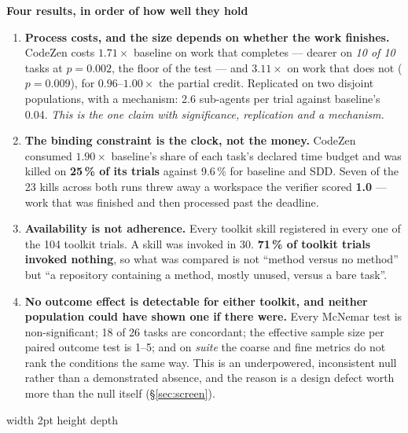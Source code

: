 \documentclass[11pt,a4paper]{article}
\newenvironment{finding}[1]
  {\par\medskip\noindent\begin{lrbox}{\findingbox}%
   \begin{minipage}{\dimexpr\linewidth-2\fboxsep-4pt}%
   \vspace{3pt}\textbf{\color{accent}#1}\par\smallskip\small}
  {\vspace{4pt}\end{minipage}\end{lrbox}%
   \noindent\textcolor{accent}{\vrule width 2pt height \dimexpr\ht\findingbox\relax depth \dimexpr\dp\findingbox\relax}%
   \colorbox{shade}{\usebox{\findingbox}}\par\medskip}
\begin{document}
\begin{finding}{Four results, in order of how well they hold}
\begin{enumerate}[nosep]
\item \textbf{Process costs, and the size depends on whether the work finishes.} CodeZen
      costs $\mathbf{1.71\times}$ baseline on work that completes --- dearer on \emph{10 of
      10} tasks at $p = 0.002$, the floor of the test --- and $\mathbf{3.11\times}$ on work
      that does not ($p = 0.009$), for $0.96$--$1.00\times$ the partial credit. Replicated on
      two disjoint populations, with a mechanism: 2.6 sub-agents per trial against baseline's
      0.04. \emph{This is the one claim with significance, replication and a mechanism.}
\item \textbf{The binding constraint is the clock, not the money.} CodeZen consumed
      $1.90\times$ baseline's share of each task's declared time budget and was killed on
      \textbf{25\,\% of its trials} against 9.6\,\% for baseline and SDD. Seven of the 23
      kills across both runs threw away a workspace the verifier scored \textbf{1.0} --- work
      that was finished and then processed past the deadline.
\item \textbf{Availability is not adherence.} Every toolkit skill registered in every one of
      the 104 toolkit trials. A skill was invoked in 30. \textbf{71\,\% of toolkit trials
      invoked nothing}, so what was compared is not ``method versus no method'' but ``a
      repository containing a method, mostly unused, versus a bare task''.
\item \textbf{No outcome effect is detectable for either toolkit, and neither population
      could have shown one if there were.} Every McNemar test is non-significant; 18 of 26
      tasks are concordant; the effective sample size per paired outcome test is 1--5; and on
      \emph{suite} the coarse and fine metrics do not rank the conditions the same way. This
      is an underpowered, inconsistent null rather than a demonstrated absence, and the reason
      is a design defect worth more than the null itself (\S\ref{sec:screen}).
\end{enumerate}
\end{finding}
\end{document}

